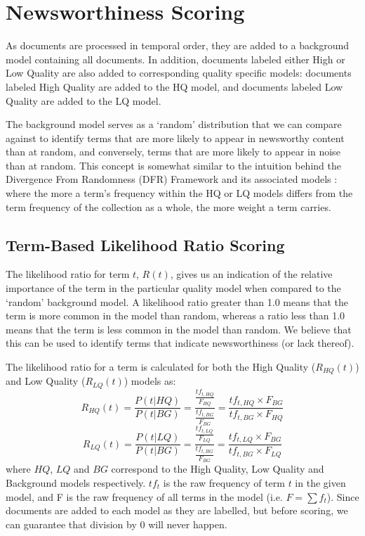 
\section{Newsworthiness Scoring}
\label{scoring:sec:scoring}

As documents are processed in temporal order, they are added to a background model containing all documents.
In addition, documents labeled either High or Low Quality are also added to corresponding quality specific models: documents labeled High Quality are added to the HQ model, and documents labeled Low Quality are added to the LQ model.

The background model serves as a `random' distribution that we can compare against to identify terms that are more likely to appear in newsworthy content than at random, and conversely, terms that are more likely to appear in noise than at random.
This concept is somewhat similar to the intuition behind the Divergence From Randomness (DFR) Framework and its associated models \citep{Amati02}: where the more a term's frequency within the HQ or LQ models differs from the term frequency of the collection as a whole, the more weight a term carries.

\subsection{Term-Based Likelihood Ratio Scoring}
\label{sec:scoring:likelihoodRatio}
The likelihood ratio for term \(t\), \(R(t)\), gives us an indication of the relative importance of the term in the particular quality model when compared to the `random' background model.
A likelihood ratio greater than 1.0 means that the term is more common in the model than random, whereas a ratio less than 1.0 means that the term is less common in the model than random.
We believe that this can be used to identify terms that indicate newsworthiness (or lack thereof).

The likelihood ratio for a term is calculated for both the High Quality (\(R_{HQ}(t)\)) and Low Quality (\(R_{LQ}(t)\)) models as:
\begin{equation}
	R_{HQ}(t) =
	\frac{
		P(t|HQ)
	}{
		P(t|BG)
	} =
	\frac{
		\frac{tf_{t,HQ}}{F_{HQ}}
	}{
		\frac{tf_{t,BG}}{F_{BG}}
	} =
	\frac{
		tf_{t,HQ} \times F_{BG}
	} {
		tf_{t,BG} \times F_{HQ}
	}
\end{equation}
\begin{equation}
	R_{LQ}(t) =
	\frac{
		P(t|LQ)
	}{
		P(t|BG)
	} =
	\frac{
		\frac{tf_{t,LQ}}{F_{LQ}}
	}{
		\frac{tf_{t,BG}}{F_{BG}}
	} =
	\frac{
		tf_{t,LQ} \times F_{BG}
	} {
		tf_{t,BG} \times F_{LQ}
	}
\end{equation}
where \(HQ\), \(LQ\) and \(BG\) correspond to the High Quality, Low Quality and Background models respectively. \(tf_t\) is the raw frequency of term  \(t\) in the given model, and F is the raw frequency of all terms in the model (i.e.  \(F = \sum{f_t}\)). Since documents are added to each model as they are labelled, but before scoring, we can guarantee that division by 0 will never happen.

